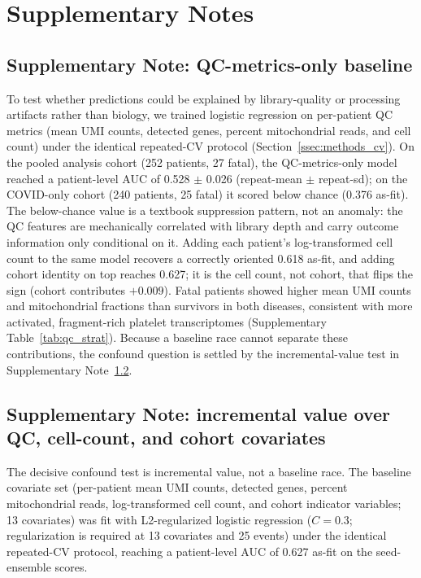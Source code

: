\appendix
\section{Supplementary Notes}

\subsection{Supplementary Note: QC-metrics-only baseline}
\label{sn:qc_baseline}

To test whether predictions could be explained by library-quality or
processing artifacts rather than biology, we trained logistic regression on
per-patient QC metrics (mean UMI counts, detected genes, percent mitochondrial
reads, and cell count) under the identical repeated-CV protocol
(Section~\ref{ssec:methods_cv}). On the pooled analysis cohort (252
patients, 27 fatal), the QC-metrics-only model reached a patient-level AUC of
0.528 $\pm$ 0.026 (repeat-mean $\pm$ repeat-sd);
on the COVID-only cohort (240 patients, 25 fatal) it scored below chance
(0.376 as-fit). The below-chance value is a textbook suppression pattern, not
an anomaly: the QC features are mechanically correlated with library depth
and carry outcome information only conditional on it. Adding each patient's
log-transformed cell count to the same model recovers a correctly oriented
0.618 as-fit, and adding cohort identity on top reaches 0.627; it is the cell
count, not cohort, that flips the sign (cohort contributes $+0.009$). Fatal
patients showed higher mean UMI counts and mitochondrial fractions than
survivors in both diseases, consistent with more activated, fragment-rich
platelet transcriptomes (Supplementary Table~\ref{tab:qc_strat}). Because a
baseline race cannot separate these contributions, the confound question is
settled by the incremental-value test in Supplementary
Note~\ref{sn:qc_incremental}.

\subsection{Supplementary Note: incremental value over QC, cell-count, and cohort covariates}
\label{sn:qc_incremental}

The decisive confound test is incremental value, not a baseline race. The
baseline covariate set (per-patient mean UMI counts, detected genes, percent
mitochondrial reads, log-transformed cell count, and cohort indicator
variables; 13 covariates) was fit with L2-regularized logistic regression
($C = 0.3$; regularization is required at 13 covariates and 25 events) under
the identical repeated-CV protocol, reaching a patient-level AUC of 0.627
as-fit on the seed-ensemble scores.

